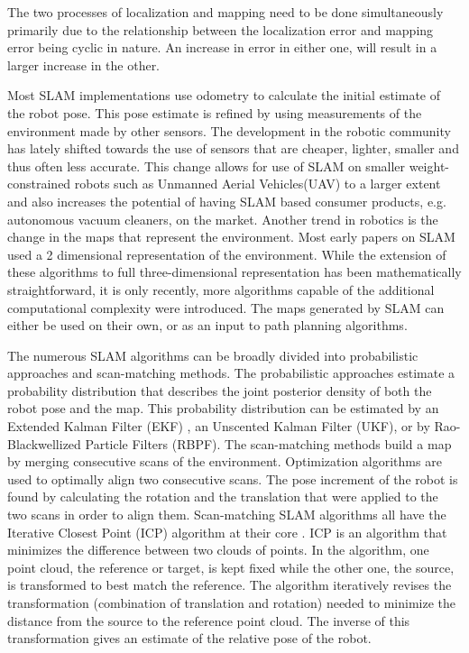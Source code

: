 	The two processes of localization and mapping need to be done simultaneously primarily due to the relationship between the localization error and mapping error being cyclic in nature. An increase in error in either one, will result in a larger increase in the other. 
	
	 Most SLAM implementations use odometry to calculate the initial estimate of the robot pose. This pose estimate is refined by using measurements of the environment made by other sensors. The development in the robotic community has lately shifted towards the	use of sensors that are cheaper, lighter, smaller and thus often less accurate. This change allows for use of SLAM on smaller weight-constrained robots such as Unmanned Aerial Vehicles(UAV) to a larger extent\cite{steder2008} and also increases the potential of having SLAM based consumer products, e.g.\, autonomous vacuum cleaners, on the market. Another trend in robotics is the change in the maps that represent the environment. Most early papers on SLAM used a 2 dimensional representation of the environment. While the extension of these algorithms to full three-dimensional representation has been mathematically straightforward, it is only recently, more algorithms capable of the additional computational complexity were introduced\cite{3d1,3d2,3d3}. The maps generated by SLAM can either be used on their own\cite{mineMapping,Arbeiter2010}, or as an input to path planning algorithms\cite{pp1,pp2,pp3,pp4,pp5,pp6}.  
	
	The numerous SLAM algorithms can be broadly divided into probabilistic approaches and scan-matching methods. The probabilistic approaches estimate a probability distribution that describes the joint posterior density of both the robot pose and the map. This probability distribution can be estimated by an Extended Kalman Filter (EKF) \cite{ekfSLAM1,ekfSLAM2,ekfSLAM3,ekfSLAM4}, an Unscented Kalman Filter (UKF)\cite{ukf1,ukf2,ukf3,ukf4}, or by Rao-Blackwellized Particle Filters (RBPF)\cite{particleSLAM1,particleSLAM2,particleSLAM3,particleSLAM4,particleSLAM5}. The scan-matching methods build a map by merging consecutive scans of the environment. Optimization algorithms are used to optimally align two consecutive scans. The pose increment of the robot is found by calculating the rotation and the translation that were applied to the two scans in order to align them. Scan-matching SLAM algorithms all have the Iterative Closest Point (ICP) algorithm at their core \cite{icp1}. ICP is an algorithm that minimizes the difference between two clouds of points. In the algorithm, one point cloud, the reference or target, is kept fixed while the other one, the source, is transformed to best match the reference. The algorithm iteratively revises the transformation (combination of translation and rotation) needed to minimize the distance from the source to the reference point cloud. The inverse of this transformation gives an estimate of the relative pose of the robot. 
		
